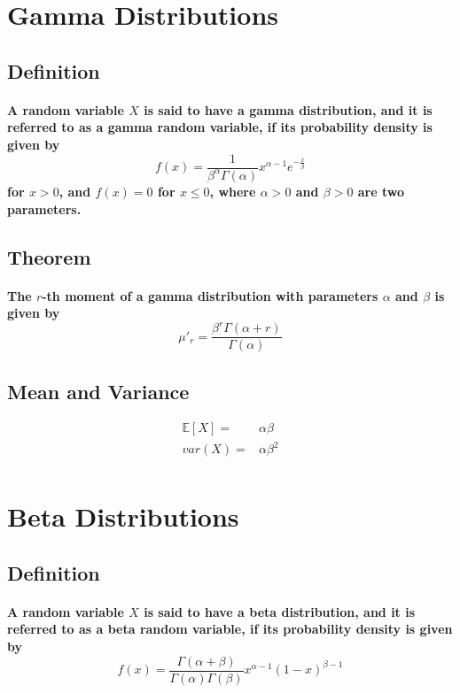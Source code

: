 \documentclass[titlepage]{article}
\begin{document}
    \section{Gamma Distributions}
        \subsection*{Definition}
            \paragraph{
                A random variable $X$ is said to have a gamma distribution, and it is referred to as a gamma random variable, if its probability density is given by 
                $$f(x)=\frac{1}{\beta^{\alpha}\Gamma(\alpha)}x^{\alpha-1}e^{-\frac{x}{\beta}}$$
                for $x>0$, and $f(x)=0$ for $x\leq 0$, where $\alpha>0$ and $\beta>0$ are two parameters.
            }
        \subsection*{Theorem}
            \paragraph{
                The $r$-th moment of a gamma distribution with parameters $\alpha$ and $\beta$ is given by 
                $$\mu'_r=\frac{\beta^r\Gamma(\alpha+r)}{\Gamma(\alpha)}$$
            }
        \subsection*{Mean and Variance}
            \begin{equation*}
                \begin{split}
                    \mathbb{E}[X]=&\alpha\beta\\
                    var(X)=&\alpha\beta^2\\
                \end{split}
            \end{equation*}
    \section{Beta Distributions}
        \subsection*{Definition}
            \paragraph{
                A random variable $X$ is said to have a beta distribution, and it is referred to as a beta random variable, if its probability density is given by
                $$f(x)=\frac{\Gamma(\alpha+\beta)}{\Gamma(\alpha)\Gamma(\beta)}x^{\alpha-1}(1-x)^{\beta-1}$$
            }
\end{document}

